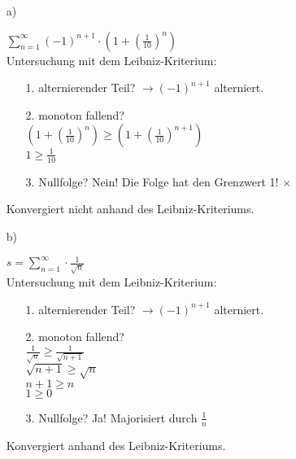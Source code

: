 \documentclass{scrreprt}
\begin{document}
\begin{enumerate}
{            \begin{enumerate}
                \item[a)]{
                    $\sum\limits_{n=1}^\infty (-1)^{n+1} \cdot (1+(\frac{1}{10})^n)$\\
                    Untersuchung mit dem Leibniz-Kriterium:\\
                    \begin{enumerate}
                        \item[1.]{
                            alternierender Teil? $\rightarrow (-1)^{n+1}$ alterniert. \checkmark
                        }
                        \item[2.]{
                            monoton fallend?\\ $(1+(\frac{1}{10})^n) \geq (1+(\frac{1}{10})^{n+1})$\\$1\geq\frac{1}{10}$ \checkmark
                        }
                        \item[3.]{
                            Nullfolge? Nein! Die Folge hat den Grenzwert 1! $\times$
                        }
                    \end{enumerate}
                    Konvergiert nicht anhand des Leibniz-Kriteriums.

                }
                \item[b)]{
                    $s=\sum\limits_{n=1}^\infty  \cdot\frac{1}{\sqrt{n}}$\\
                    Untersuchung mit dem Leibniz-Kriterium:\\
                    \begin{enumerate}
                        \item[1.]{
                            alternierender Teil? $\rightarrow (-1)^{n+1}$ alterniert. \checkmark
                        }
                        \item[2.]{
                            monoton fallend?\\ $\frac{1}{\sqrt{n}} \geq \frac{1}{\sqrt{n+1}}$ \\ $\sqrt{n+1}\geq\sqrt{n}$\\ $n+1 \geq n$ \\ $1\geq0$ \checkmark
                        }
                        \item[3.]{
                            Nullfolge? Ja! Majorisiert durch $\frac{1}{n}$  \checkmark
                        }
                    \end{enumerate}
                    Konvergiert anhand des Leibniz-Kriteriums.
                }
            \end{enumerate}
        }

    \end{enumerate}
\end{document}
